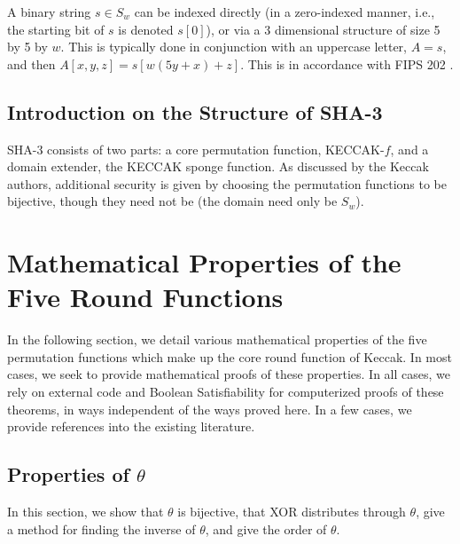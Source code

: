 \documentclass[10pt,twocolumn,twoside]{pnas-new}
\begin{document}
A binary string $s \in S_{w}$ can be indexed directly (in a zero-indexed
manner, i.e., the starting bit of $s$ is denoted $s[0]$), or via a 3
dimensional structure of size 5 by 5 by $w$. This is typically done in
conjunction with an uppercase letter, $A = s$, and then
$A[x, y, z] = s[w(5y + x) + z]$. This is in accordance with
FIPS 202 \cite{NIST202}.

\subsection{Introduction on the Structure of SHA-3} \label{sec:i:structure}

    SHA-3 consists of two parts: a core permutation function, KECCAK-$f$, and
a domain extender, the KECCAK sponge function. As discussed by the Keccak
authors, additional security is given by choosing the permutation functions to
be bijective, though they need not be (the domain need only be $S_{w}$).







\section{Mathematical Properties of the Five Round Functions} \label{sec:properties}

In the following section, we detail various mathematical properties of the five
permutation functions which make up the core round function of Keccak. In most
cases, we seek to provide mathematical proofs of these properties. In all
cases, we rely on external code and Boolean Satisfiability for computerized
proofs of these theorems, in ways independent of the ways proved here. In a
few cases, we provide references into the existing literature.


\subsection{Properties of $\theta$} \label{sec:p:t}


In this section, we show that $\theta$ is bijective, that XOR distributes
through $\theta$, give a method for finding the inverse of $\theta$, and
give the order of $\theta$.
\end{document}
